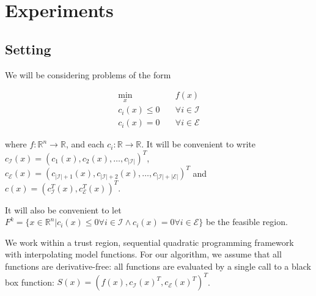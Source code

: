 \documentclass{article}
\begin{document}



\section{Experiments}
\subsection{Setting}

We will be considering problems of the form


\begin{center}
\begin{align}
\label{problem}
\min_x & \quad f(x) \\
  c_i(x) \le 0   & \quad \forall i \in \mathcal {I} \nonumber \\
  c_i(x)  = 0    & \quad \forall i \in \mathcal {E} \nonumber
\end{align}
\end{center}
where $f : \mathbb R^n \to \mathbb R$, and each $c_i : \mathbb{R} \to \mathbb{R}$.
It will be convenient to write
$c_{\mathcal {I}}(x) = (c_1(x), c_2(x), \ldots, c_{|\mathcal{I}|})^T$,
$c_{\mathcal {E}}(x) = (c_{|\mathcal{I}|+1}(x), c_{|\mathcal{I}|+2}(x), \ldots, c_{|\mathcal{I}| + |\mathcal{E}|})^T$ and
$c(x) = (c_{\mathcal{I}}^T(x), c_{\mathcal{E}}^T(x))^T$.

It will also be convenient to let $F^k = \{ x \in \mathbb R^n | c_i(x) \le 0 \forall i \in \mathcal{I} \wedge c_i(x) = 0 \forall i \in \mathcal{E}\}$ be the feasible region.

We work within a trust region, sequential quadratic programming framework with interpolating model functions.
For our algorithm, we assume that all functions are derivative-free: all functions are evaluated by a single call to a black box function:
$S(x) = (f(x), c_{\mathcal {I}}(x)^T, c_{\mathcal {E}}(x)^T)^T$.
\end{document}
